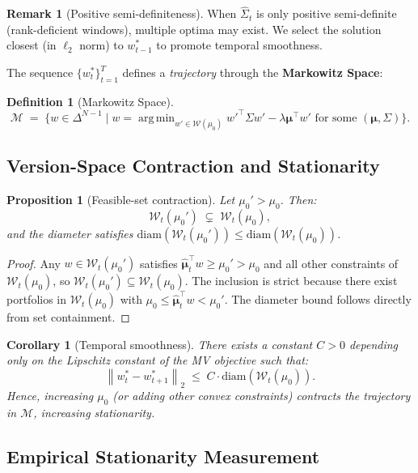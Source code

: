 \documentclass[12pt, a4paper]{report}
\theoremstyle{plain}
\newtheorem{proposition}[theorem]{Proposition}
\newtheorem{corollary}[theorem]{Corollary}
\theoremstyle{definition}
\newtheorem{definition}[theorem]{Definition}
\newtheorem{remark}[theorem]{Remark}
\newcommand{\calM}{\mathcal{M}}
\newcommand{\calW}{\mathcal{W}}
\newcommand{\bmu}{\bm{\mu}}
\newcommand{\norm}[1]{\left\|#1\right\|}
\DeclareMathOperator*{\argmin}{arg\,min}
\begin{document}
\begin{remark}[Positive semi-definiteness]
When $\hat{\Sigma}_t$ is only positive semi-definite (rank-deficient windows),
multiple optima may exist.  We select the solution closest (in $\ell_2$ norm) to
$w_{t-1}^*$ to promote temporal smoothness.
\end{remark}

The sequence $\{w_t^*\}_{t=1}^T$ defines a \emph{trajectory} through the
\textbf{Markowitz Space}:
\begin{definition}[Markowitz Space]
\[
  \calM \;=\; \bigl\{ w \in \Delta^{N-1} \;\big|\;
    w = \argmin_{w'\in\calW(\mu_0)} w'^\top\Sigma w' - \lambda\bmu^\top w'
    \text{ for some } (\bmu,\Sigma) \bigr\}.
\]
\end{definition}

\subsection{Version-Space Contraction and Stationarity}
\label{subsec:version_space}

\begin{proposition}[Feasible-set contraction]
\label{prop:contraction}
Let $\mu_0' > \mu_0$.  Then:
\[
  \calW_t(\mu_0') \;\subsetneq\; \calW_t(\mu_0),
\]
and the diameter satisfies $\mathrm{diam}(\calW_t(\mu_0')) \le \mathrm{diam}(\calW_t(\mu_0))$.
\end{proposition}

\begin{proof}
Any $w \in \calW_t(\mu_0')$ satisfies $\hat{\bmu}_t^\top w \ge \mu_0' > \mu_0$
and all other constraints of $\calW_t(\mu_0)$, so
$\calW_t(\mu_0') \subseteq \calW_t(\mu_0)$.
The inclusion is strict because there exist portfolios in $\calW_t(\mu_0)$ with
$\mu_0 \le \hat{\bmu}_t^\top w < \mu_0'$.
The diameter bound follows directly from set containment.
\end{proof}

\begin{corollary}[Temporal smoothness]
\label{cor:smoothness}
There exists a constant $C > 0$ depending only on the Lipschitz constant of the
MV objective such that:
\[
  \norm{w_t^* - w_{t+1}^*}_2
  \;\le\; C \cdot \mathrm{diam}(\calW_t(\mu_0)).
\]
Hence, increasing $\mu_0$ (or adding other convex constraints) \emph{contracts}
the trajectory in $\calM$, increasing stationarity.
\end{corollary}

\subsection{Empirical Stationarity Measurement}
\label{subsec:stationarity_measure}
\end{document}
